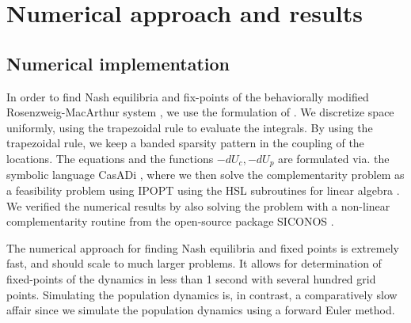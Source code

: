 \section{Numerical approach and results}
\subsection{Numerical implementation}
In order to find Nash equilibria and fix-points of the behaviorally modified Rosenzweig-MacArthur  system , we use the formulation of . We discretize space uniformly, using the trapezoidal rule to evaluate the integrals. By using the trapezoidal rule, we keep a banded sparsity pattern in the coupling of the locations. The equations  and the functions $-dU_c, -dU_p$ are formulated via. the symbolic language CasADi \citep{Andersson2019}, where we then solve the complementarity problem as a feasibility problem using IPOPT \citep{wachter2006implementation} using the HSL subroutines for linear algebra \citep{hsl2007collection}. We verified the numerical results by also solving the problem with a non-linear complementarity routine from the open-source package SICONOS \citep{acary2019introduction}.

The numerical approach for finding Nash equilibria and fixed points is extremely fast, and should scale to much larger problems. It allows for determination of fixed-points of the dynamics in less than 1 second with several hundred grid points. Simulating the population dynamics is, in contrast, a comparatively slow affair since we simulate the population dynamics using a forward Euler method.
